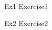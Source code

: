 \documentclass[12pt     ,
               a4paper  ,
               fleqn    ,
               twoside  ,
               numbers  = noenddot]
               {article}
\begin{document}
	\pagestyle{fancy}
	
	

		    	{Ex1}
		    	{Exercise1}

		    	{Ex2}
		    	{Exercise2}

\end{document}
